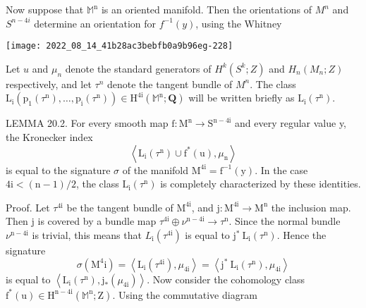 \documentclass[10pt]{article}
\begin{document}
Now suppose that $\mathbb{M}^{\mathrm{n}}$ is an oriented manifold. Then the orientations of $M^{n}$ and $S^{n-4 i}$ determine an orientation for $f^{-1}(y)$, using the Whitney

\texttt{[image: 2022\_08\_14\_41b28ac3bebfb0a9b96eg-228]}

Let $u$ and $\mu_{n}$ denote the standard generators of $H^{k}\left(S^{k} ; Z\right)$ and $H_{n}\left(M_{n} ; Z\right)$ respectively, and let $\tau^{n}$ denote the tangent bundle of $M^{n}$. The class $\mathrm{L}_{\mathrm{i}}\left(\mathrm{p}_{1}\left(\tau^{\mathrm{n}}\right), \ldots, \mathrm{p}_{\mathrm{i}}\left(\tau^{\mathrm{n}}\right)\right) \in \mathrm{H}^{4 \mathrm{i}}\left(\mathbb{M}^{\mathrm{n}} ; \mathbf{Q}\right)$ will be written briefly as $\mathrm{L}_{\mathrm{i}}\left(\tau^{\mathrm{n}}\right)$.

LEMMA 20.2. For every smooth map $\mathrm{f}: \mathrm{M}^{\mathrm{n}} \rightarrow \mathrm{S}^{\mathrm{n}-4 \mathrm{i}}$ and every regular value y, the Kronecker index
$$
\left\langle\mathrm{L}_{\mathrm{i}}\left(\tau^{\mathrm{n}}\right) \cup \mathrm{f}^{*}(\mathrm{u}), \mu_{\mathrm{n}}\right\rangle
$$
is equal to the signature $\sigma$ of the manifold $\mathrm{M}^{4 \mathrm{i}}=\mathrm{f}^{-1}(\mathrm{y})$. In the case $4 \mathrm{i}<(\mathrm{n}-1) / 2$, the class $\mathrm{L}_{\mathrm{i}}\left(\tau^{\mathrm{n}}\right)$ is completely characterized by these identities.

Proof. Let $\tau^{4 \mathrm{i}}$ be the tangent bundle of $\mathrm{M}^{4 \mathrm{i}}$, and $\mathrm{j}: \mathrm{M}^{4 \mathrm{i}} \rightarrow \mathrm{M}^{\mathrm{n}}$ the inclusion map. Then $\mathrm{j}$ is covered by a bundle map $\tau^{4 \mathrm{i}} \oplus \nu^{\mathrm{n}-4 \mathrm{i}} \rightarrow \tau^{\mathrm{n}}$. Since the normal bundle $\nu^{\mathrm{n}-4 \mathrm{i}}$ is trivial, this means that $L_{\mathrm{i}}\left(\tau^{4 \mathrm{i}}\right)$ is equal to $\mathrm{j}^{*} \mathrm{~L}_{\mathrm{i}}\left(\tau^{\mathrm{n}}\right)$. Hence the signature
$$
\sigma\left(\mathrm{M}^{4} \mathrm{i}\right)=\left\langle\mathrm{L}_{\mathrm{i}}\left(\tau^{4 \mathrm{i}}\right), \mu_{4 \mathrm{i}}\right\rangle=\left\langle\mathrm{j}^{*} \mathrm{~L}_{\mathrm{i}}\left(\tau^{\mathrm{n}}\right), \mu_{4 \mathrm{i}}\right\rangle
$$
is equal to $\left\langle\mathrm{L}_{\mathrm{i}}\left(\tau^{\mathrm{n}}\right), \mathrm{j}_{*}\left(\mu_{4 \mathrm{i}}\right)\right\rangle$. Now consider the cohomology class $\mathrm{f}^{*}(\mathrm{u}) \in \mathrm{H}^{\mathrm{n}-4 \mathrm{i}}\left(\mathbb{M}^{\mathrm{n}} ; \mathrm{Z}\right)$. Using the commutative diagram
\end{document}
